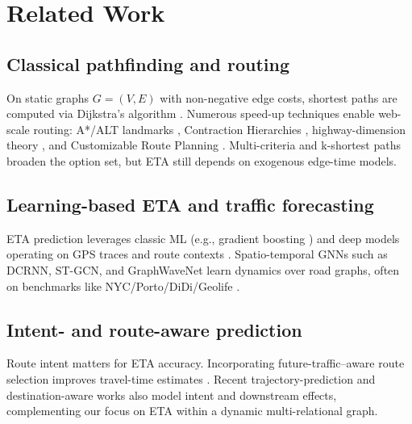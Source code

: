 \section{Related Work}
\subsection{Classical pathfinding and routing}
On static graphs \(G=(V,E)\) with non-negative edge costs, shortest paths are computed via Dijkstra's algorithm \cite{dijkstra1959}. Numerous speed-up techniques enable web-scale routing: A*/ALT landmarks \cite{goldberg2005alt}, Contraction Hierarchies \cite{geisberger2008ch}, highway-dimension theory \cite{abraham2010highwaydimension}, and Customizable Route Planning \cite{delling2011crp}. Multi-criteria and k-shortest paths \cite{yen1971ksp} broaden the option set, but ETA still depends on exogenous edge-time models.

\subsection{Learning-based ETA and traffic forecasting}
ETA prediction leverages classic ML (e.g., gradient boosting \cite{chen2016xgboost}) and deep models operating on GPS traces and route contexts \cite{wang2018deeptte,xu2020tadnm,wang2022metatte,abbar2020stad}. Spatio-temporal GNNs such as DCRNN, ST-GCN, and GraphWaveNet \cite{li2018dcrnn,yu2018stgcn,wu2019graphwavenet} learn dynamics over road graphs, often on benchmarks like NYC/Porto/DiDi/Geolife \cite{nyc_tlc,moreira2013porto,didi2016,zheng2012geolife}.

\subsection{Intent- and route-aware prediction}
Route intent matters for ETA accuracy. Incorporating future-traffic–aware route selection improves travel-time estimates \cite{voloch2021}. Recent trajectory-prediction and destination-aware works also model intent and downstream effects, complementing our focus on ETA within a dynamic multi-relational graph.
